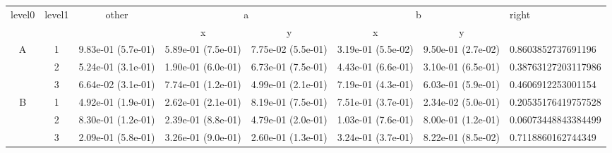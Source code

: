 \begin{tabular}{cccccccl}
\toprule
\multirow{2}{*}{level0} & \multirow{2}{*}{level1}& \multirow{2}{*}{other}&\multicolumn{2}{c}{a}&\multicolumn{2}{c}{b}& \multirow{2}{*}{right}\tabularnewline
\cmidrule(lr){4-5}
\cmidrule(lr){6-7}
&&&x&y&x&y\tabularnewline
\midrule
\multirow{3}{*}{A}&1& 9.83e-01 (5.7e-01)& 5.89e-01 (7.5e-01)& 7.75e-02 (5.5e-01)& 3.19e-01 (5.5e-02)& 9.50e-01 (2.7e-02)& 0.8603852737691196\tabularnewline
&2& 5.24e-01 (3.1e-01)& 1.90e-01 (6.0e-01)& 6.73e-01 (7.5e-01)& 4.43e-01 (6.6e-01)& 3.10e-01 (6.5e-01)& 0.38763127203117986\tabularnewline
&3& 6.64e-02 (3.1e-01)& 7.74e-01 (1.2e-01)& 4.99e-01 (2.1e-01)& 7.19e-01 (4.3e-01)& 6.03e-01 (5.9e-01)& 0.4606912253001154\tabularnewline
\midrule
\multirow{3}{*}{B}&1& 4.92e-01 (1.9e-01)& 2.62e-01 (2.1e-01)& 8.19e-01 (7.5e-01)& 7.51e-01 (3.7e-01)& 2.34e-02 (5.0e-01)& 0.20535176419757528\tabularnewline
&2& 8.30e-01 (1.2e-01)& 2.39e-01 (8.8e-01)& 4.79e-01 (2.0e-01)& 1.03e-01 (7.6e-01)& 8.00e-01 (1.2e-01)& 0.06073448843384499\tabularnewline
&3& 2.09e-01 (5.8e-01)& 3.26e-01 (9.0e-01)& 2.60e-01 (1.3e-01)& 3.24e-01 (3.7e-01)& 8.22e-01 (8.5e-02)& 0.7118860162744349\tabularnewline
\bottomrule
\end{tabular}
